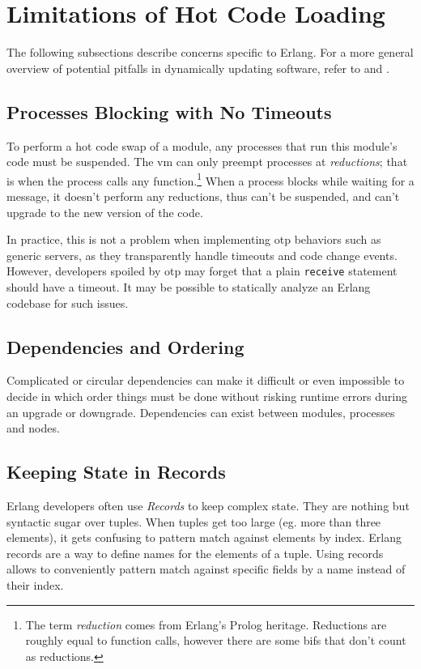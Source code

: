 \section{Limitations of Hot Code Loading}

The following subsections describe concerns specific to Erlang. For a more general overview of potential pitfalls in dynamically updating software, refer to \cite{gregersen:phenomena} and \cite{hicks}.

\subsection{Processes Blocking with No Timeouts}

To perform a hot code swap of a module, any processes that run this module's code must be suspended. The \acrshort{vm} can only preempt processes at \emph{reductions}; that is when the process calls any function.\footnote{The term \emph{reduction} comes from Erlang's Prolog heritage. Reductions are roughly equal to function calls, however there are some \acrshort{bif}s that don't count as reductions.} When a process blocks while waiting for a message, it doesn't perform any reductions, thus can't be suspended, and can't upgrade to the new version of the code.

In practice, this is not a problem when implementing \acrshort{otp} behaviors such as generic servers, as they transparently handle timeouts and code change events. However, developers spoiled by \acrshort{otp} may forget that a plain \lstinline|receive| statement should have a timeout. It may be possible to statically analyze an Erlang codebase for such issues.

\subsection{Dependencies and Ordering}

Complicated or circular dependencies can make it difficult or even impossible to decide in which order things must be done without risking runtime errors during an upgrade or downgrade.\cite[352]{doc:otp} Dependencies can exist between modules, processes and nodes.

\subsection{Keeping State in Records}

Erlang developers often use \emph{Records} to keep complex state. They are nothing but syntactic sugar over tuples. When tuples get too large (eg. more than three elements), it gets confusing to pattern match against elements by index. Erlang records are a way to define names for the elements of a tuple. Using records allows to conveniently pattern match against specific fields by a name instead of their index.


